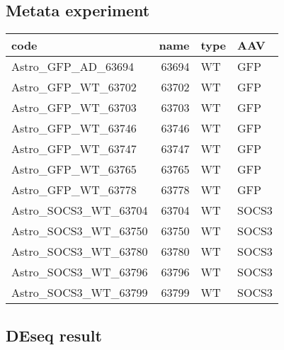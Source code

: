 \documentclass[]{article}
\begin{document}
\hypertarget{metata-experiment}{%
\subsection{Metata experiment}\label{metata-experiment}}

\begin{table}[H]
\centering
\begin{tabular}{lrll}
\toprule
code & name & type & AAV\\
\midrule
\rowcolor[HTML]{ccffff}  Astro\_GFP\_AD\_63694 & 63694 & WT & GFP\\
Astro\_GFP\_WT\_63702 & 63702 & WT & GFP\\
\rowcolor[HTML]{ccffff}  Astro\_GFP\_WT\_63703 & 63703 & WT & GFP\\
Astro\_GFP\_WT\_63746 & 63746 & WT & GFP\\
\rowcolor[HTML]{ccffff}  Astro\_GFP\_WT\_63747 & 63747 & WT & GFP\\
\addlinespace
Astro\_GFP\_WT\_63765 & 63765 & WT & GFP\\
\rowcolor[HTML]{ccffff}  Astro\_GFP\_WT\_63778 & 63778 & WT & GFP\\
Astro\_SOCS3\_WT\_63704 & 63704 & WT & SOCS3\\
\rowcolor[HTML]{ccffff}  Astro\_SOCS3\_WT\_63750 & 63750 & WT & SOCS3\\
Astro\_SOCS3\_WT\_63780 & 63780 & WT & SOCS3\\
\addlinespace
\rowcolor[HTML]{ccffff}  Astro\_SOCS3\_WT\_63796 & 63796 & WT & SOCS3\\
Astro\_SOCS3\_WT\_63799 & 63799 & WT & SOCS3\\
\bottomrule
\end{tabular}
\end{table}

\hypertarget{deseq-result}{%
\subsection{DEseq result}\label{deseq-result}}
\end{document}
